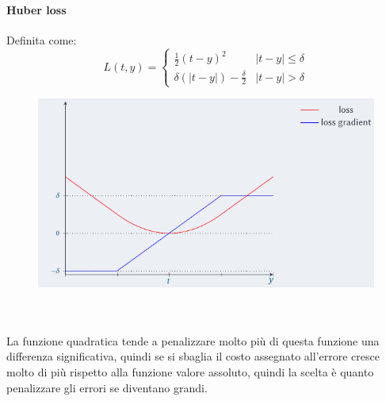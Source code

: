 \documentclass[12pt, oneside]{extbook}
\begin{document}
\paragraph{Huber loss} Definita come:
\begin{equation}
	L(t,y) = 
	\begin{cases}
		\frac{1}{2} (t-y)^2 & |t-y| \leq \delta \\
		\delta(|t-y|) - \frac{\delta}{2} & |t-y| > \delta
	\end{cases}
\end{equation}
\begin{figure}
	\includegraphics[scale=0.5]{immagini/huber_loss.png}
\end{figure}\\\\
La funzione quadratica tende a penalizzare molto più di questa funzione una differenza significativa, quindi se si sbaglia il costo assegnato all'errore cresce molto di più rispetto alla funzione valore assoluto, quindi la scelta è quanto penalizzare gli errori se diventano grandi.
\end{document}
